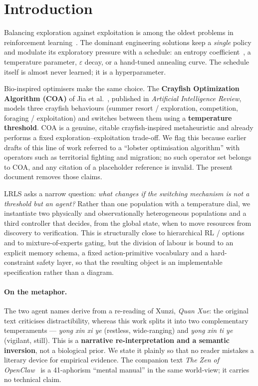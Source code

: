 \documentclass[11pt,a4paper]{article}
\begin{document}
\section{Introduction}
Balancing exploration against exploitation is among the oldest problems in reinforcement learning~\cite{kaelbling}. The dominant engineering solutions keep a \emph{single} policy and modulate its exploratory pressure with a schedule: an entropy coefficient~\cite{sac}, a temperature parameter, $\varepsilon$ decay, or a hand-tuned annealing curve. The schedule itself is almost never learned; it is a hyperparameter.

Bio-inspired optimisers make the same choice. The \textbf{Crayfish Optimization Algorithm (COA)} of Jia et al.~\cite{coa}, published in \emph{Artificial Intelligence Review}, models three crayfish behaviours (summer resort / exploration, competition, foraging / exploitation) and switches between them using a \textbf{temperature threshold}. COA is a genuine, citable crayfish-inspired metaheuristic and already performs a fixed exploration--exploitation trade-off. We flag this because earlier drafts of this line of work referred to a ``lobster optimisation algorithm'' with operators such as territorial fighting and migration; no such operator set belongs to COA, and any citation of a placeholder reference is invalid. The present document removes those claims.

LRLS asks a narrow question: \emph{what changes if the switching mechanism is not a threshold but an agent?} Rather than one population with a temperature dial, we instantiate two physically and observationally heterogeneous populations and a third controller that decides, from the global state, when to move resources from discovery to verification. This is structurally close to hierarchical RL / options~\cite{options} and to mixture-of-experts gating, but the division of labour is bound to an explicit memory schema, a fixed action-primitive vocabulary and a hard-constraint safety layer, so that the resulting object is an implementable specification rather than a diagram.

\paragraph{On the metaphor.} The two agent names derive from a re-reading of Xunzi, \emph{Quan Xue}: the original text criticises distractibility, whereas this work splits it into two complementary temperaments --- \emph{yong xin xi ye} (restless, wide-ranging) and \emph{yong xin ti ye} (vigilant, still). This is a \textbf{narrative re-interpretation and a semantic inversion}, not a biological prior. We state it plainly so that no reader mistakes a literary device for empirical evidence. The companion text \emph{The Zen of OpenClaw}~\cite{zen} is a 41-aphorism ``mental manual'' in the same world-view; it carries no technical claim.
\end{document}
